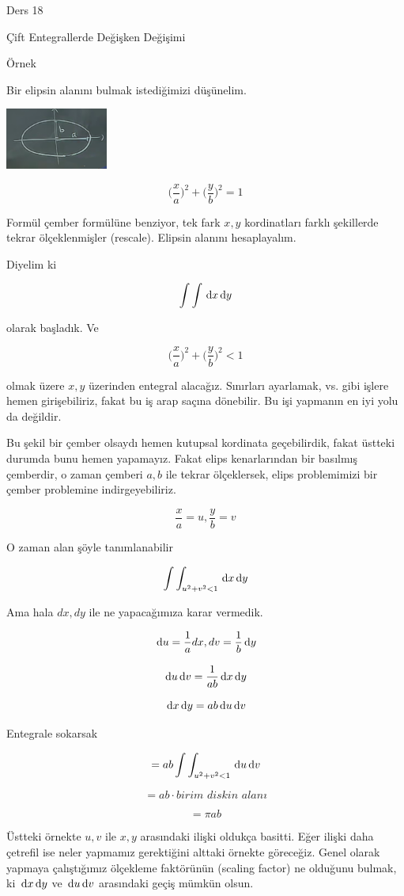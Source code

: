 \documentclass[12pt,fleqn]{article}\usepackage{../../common}
\begin{document}
Ders 18

Çift Entegrallerde Değişken Değişimi 

Örnek 

Bir elipsin alanını bulmak istediğimizi düşünelim. 

\includegraphics[height=2cm]{18_1.png}

$$ \bigg(\frac{x}{a}\bigg)^2 + \bigg(\frac{y}{b}\bigg)^2 = 1 $$

Formül çember formülüne benziyor, tek fark $x,y$ kordinatları farklı
şekillerde tekrar ölçeklenmişler (rescale). Elipsin alanını hesaplayalım. 

Diyelim ki 

$$ \int \int \,\mathrm{d} x \,\mathrm{d} y $$

olarak başladık. Ve

$$ \bigg(\frac{x}{a}\bigg)^2 + \bigg(\frac{y}{b}\bigg)^2 < 1 $$

olmak üzere $x,y$ üzerinden entegral alacağız. Sınırları ayarlamak, vs. gibi
işlere hemen girişebiliriz, fakat bu iş arap saçına dönebilir. Bu işi yapmanın
en iyi yolu da değildir.

Bu şekil bir çember olsaydı hemen kutupsal kordinata geçebilirdik, fakat üstteki
durumda bunu hemen yapamayız. Fakat elips kenarlarından bir basılmış çemberdir,
o zaman çemberi $a,b$ ile tekrar ölçeklersek, elips problemimizi bir çember
problemine indirgeyebiliriz.

$$ \frac{x}{a} = u, \frac{y}{b} = v $$

O zaman alan şöyle tanımlanabilir 

$$ \int \int_{u^2 + v^2 < 1} \,\mathrm{d} x \,\mathrm{d} y $$

Ama hala $dx,dy$ ile ne yapacağımıza karar vermedik. 

$$ \,\mathrm{d} u = \frac{1}{a}dx,dv = \frac{1}{b} \,\mathrm{d} y $$

$$ \,\mathrm{d} u \,\mathrm{d} v = \frac{1}{ab} \,\mathrm{d} x \,\mathrm{d} y $$

$$ \,\mathrm{d} x \,\mathrm{d} y = ab \,\mathrm{d} u \,\mathrm{d} v $$

Entegrale sokarsak

$$ = ab \int \int_{u^2 + v^2 < 1} \,\mathrm{d} u \,\mathrm{d} v $$

$$ = ab \cdot \textit{birim diskin alanı} $$

$$ = \pi ab $$

Üstteki örnekte $u,v$ ile $x,y$ arasındaki ilişki oldukça basitti. Eğer ilişki
daha çetrefil ise neler yapmamız gerektiğini alttaki örnekte göreceğiz. Genel
olarak yapmaya çalıştığımız ölçekleme faktörünün (scaling factor) ne olduğunu
bulmak, ki $\,\mathrm{d} x \,\mathrm{d} y$ ve $\,\mathrm{d} u \,\mathrm{d} v$ arasındaki geçiş mümkün olsun.
\end{document}
